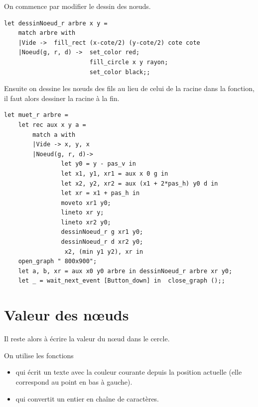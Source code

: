 \begin{Answer}

On commence par modifier le dessin des nœuds.
\begin{lstlisting}
let dessinNoeud_r arbre x y =
    match arbre with
    |Vide ->  fill_rect (x-cote/2) (y-cote/2) cote cote
    |Noeud(g, r, d) ->  set_color red;
                        fill_circle x y rayon;
                        set_color black;;
\end{lstlisting}

Ensuite on dessine les nœuds des fils au lieu de celui de la racine dans la fonction, il faut alors dessiner la racine à la fin.

\begin{lstlisting}
let muet_r arbre =
    let rec aux x y a =
        match a with
        |Vide -> x, y, x
        |Noeud(g, r, d)-> 
                let y0 = y - pas_v in
                let x1, y1, xr1 = aux x 0 g in
                let x2, y2, xr2 = aux (x1 + 2*pas_h) y0 d in
                let xr = x1 + pas_h in
                moveto xr1 y0;
                lineto xr y;
                lineto xr2 y0;
                dessinNoeud_r g xr1 y0;
                dessinNoeud_r d xr2 y0;
                 x2, (min y1 y2), xr in
    open_graph " 800x900";
    let a, b, xr = aux x0 y0 arbre in dessinNoeud_r arbre xr y0;
    let _ = wait_next_event [Button_down] in  close_graph ();;
\end{lstlisting}
\newpage
\end{Answer}

\newpage

\section{Valeur des nœuds}

Il reste alors à écrire la valeur du nœud dans le cercle.

On utilise les fonctions 
\begin{itemize}
  \item {} qui écrit un texte avec la couleur courante depuis la position actuelle (elle correspond au point en bas à gauche).
  \item {} qui convertit un entier en chaîne de caractères.
\end{itemize}

